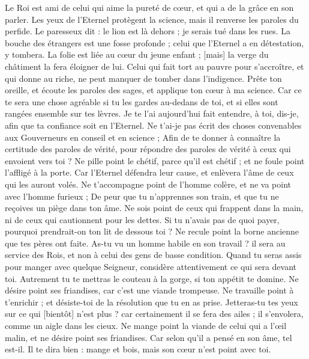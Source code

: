 \begin{multicols}{2}
Le Roi est ami de celui qui aime la pureté de cœur, et qui a de la grâce en son parler.
Les yeux de l'Eternel protègent la science, mais il renverse les paroles du perfide.
Le paresseux dit : le lion est là dehors ; je serais tué dans les rues.
La bouche des étrangers est une fosse profonde ; celui que l'Eternel a en détestation, y tombera.
La folie est liée au cœur du jeune enfant ; [mais] la verge du châtiment la fera éloigner de lui.
Celui qui fait tort au pauvre pour s'accroître, et qui donne au riche, ne peut manquer de tomber dans l'indigence.
Prête ton oreille, et écoute les paroles des sages, et applique ton cœur à ma science.
Car ce te sera une chose agréable si tu les gardes au-dedans de toi, et si elles sont rangées ensemble sur tes lèvres.
Je te l'ai aujourd'hui fait entendre, à toi, dis-je, afin que ta confiance soit en l'Eternel.
Ne t'ai-je pas écrit des choses convenables aux Gouverneurs en conseil et en science ;
Afin de te donner à connaître la certitude des paroles de vérité, pour répondre des paroles de vérité à ceux qui envoient vers toi ?
Ne pille point le chétif, parce qu'il est chétif ; et ne foule point l'affligé à la porte.
Car l'Eternel défendra leur cause, et enlèvera l'âme de ceux qui les auront volés.
Ne t'accompagne point de l'homme colère, et ne va point avec l'homme furieux ;
De peur que tu n'apprennes son train, et que tu ne reçoives un piège dans ton âme.
Ne sois point de ceux qui frappent dans la main, ni de ceux qui cautionnent pour les dettes.
Si tu n'avais pas de quoi payer, pourquoi prendrait-on ton lit de dessous toi ?
Ne recule point la borne ancienne que tes pères ont faite.
As-tu vu un homme habile en son travail ? il sera au service des Rois, et non à celui des gens de basse condition.
\VerseOne{}Quand tu seras assis pour manger avec quelque Seigneur, considère attentivement ce qui sera devant toi.
Autrement tu te mettras le couteau à la gorge, si ton appétit te domine.
Ne désire point ses friandises, car c'est une viande trompeuse.
Ne travaille point à t'enrichir ; et désiste-toi de la résolution que tu en as prise.
Jetteras-tu tes yeux sur ce qui [bientôt] n'est plus ? car certainement il se fera des ailes ; il s'envolera, comme un aigle dans les cieux.
Ne mange point la viande de celui qui a l'œil malin, et ne désire point ses friandises.
Car selon qu'il a pensé en son âme, tel est-il. Il te dira bien : mange et bois, mais son cœur n'est point avec toi.

\end{multicols}
